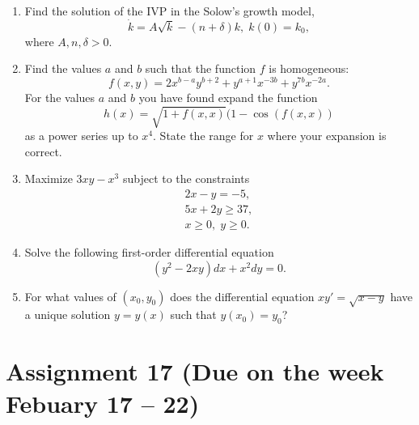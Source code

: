 \documentclass[12pt]{article} %
\theoremstyle{definition} %
\begin{document}
\begin{enumerate}
\item Find the solution of the IVP in the Solow's growth model, 
\[
	\dot k=A\sqrt{k}-(n+\delta)k, \; k(0)=k_0,
\]
where $A,n,\delta>0$.

\item Find the values $a$ and $b$ such that the function $f$ is homogeneous:
\[
	f(x,y)=2x^{b-a}y^{b+2}+y^{a+1}x^{-3b}+y^{7b}x^{-2a}.
\]
For the values $a$ and $b$ you have found expand the function 
\[
	h(x)=\sqrt{1+f(x,x)}(1-\cos(f(x,x))
\]
as a power series up to $x^4$. State the range for $x$ where your expansion is correct.

\item Maximize $3xy-x^3$ subject to the constraints
\[
\begin{array}{l}
2x-y=-5,\\
5x+2y\geq 37,\\
x\geq 0,\; y\geq 0.
\end{array}
\]
\item Solve the following first-order differential equation 
\[
(y^2-2xy)dx+x^2dy=0.
\]
\item For what values of $(x_0,y_0)$ does the differential equation $xy'=\sqrt{x-y}$ 
have a unique solution $y=y(x)$ such that $y(x_0)=y_0$?
\end{enumerate}





\section*{Assignment 17 (Due on the week Febuary 17 – 22)}
\end{document}
